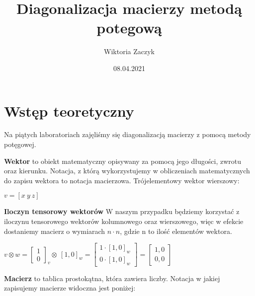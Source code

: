 \documentclass{article}
\title{Diagonalizacja macierzy metodą potegową}
\author{Wiktoria Zaczyk}
\date{08.04.2021}
\begin{document}
\maketitle

\section{Wstęp teoretyczny}
Na piątych laboratoriach zajęliśmy się diagonalizacją macierzy z pomocą metody potęgowej.

\newline\newline

\textbf{Wektor} to obiekt matematyczny opisywany za pomocą jego długości, zwrotu oraz kierunku. Notacja,
z którą wykorzystujemy w obliczeniach matematycznych do zapisu wektora to notacja macierzowa.
Trójelementowy wektor wierszowy:

\newline
\begin{center}
$v = [x~ y~ z]$
\end{center}

\newline\newline
\textbf{Iloczyn tensorowy wektorów}
\newline
W naszym przypadku będziemy korzystać z iloczynu tensorowego wektorów kolumnowego oraz wierszowego, więc w efekcie dostaniemy macierz o wymiarach $n \cdot n$, gdzie n to ilość elementów wektora.

\newline
\begin{center}
$v \otimes w = 
\left[\begin{array}{cc}
1\\
0
\end{array}\right]_v 
\otimes
~[1,0]_w =
\left[\begin{array}{cc}
1 \cdot [1,0]_w\\
0 \cdot [1,0]_w
\end{array}\right]
= \left[\begin{array}{cc}
1, 0\\
0,0
\end{array}\right]
$
\end{center}

\newline\newline
\textbf{Macierz} to tablica prostokątna, która zawiera liczby. Notacja w jakiej zapisujemy macierze widoczna
jest poniżej:
\end{document}

